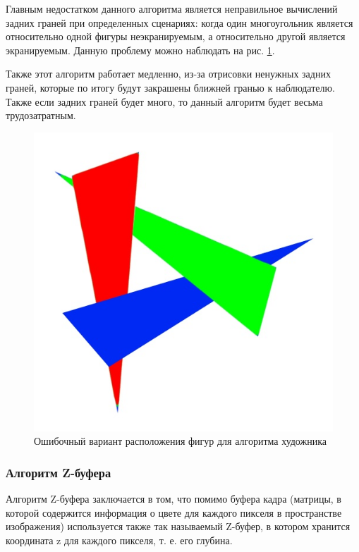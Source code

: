 \vspace{0.3cm}Главным недостатком данного алгоритма является неправильное вычислений задних граней при определенных сценариях: когда один многоугольник является относительно одной фигуры неэкранируемым, а относительно другой является экранируемым. Данную проблему можно наблюдать на рис. \ref{fig:painter}.

\vspace{0.3cm}Также этот алгоритм работает медленно, из-за отрисовки ненужных задних граней, которые по итогу будут закрашены ближней гранью к наблюдателю. Также если задних граней будет много, то данный алгоритм будет весьма трудозатратным.

\begin{figure}[ht!]
	\centering
	\includegraphics[scale=0.6]{painter}
	\caption{Ошибочный вариант расположения фигур для алгоритма художника}
	\label{fig:painter}
\end{figure}

\newpage

\subsubsection{Алгоритм Z-буфера}
\hspace{0.6cm}Алгоритм Z-буфера заключается в том, что помимо буфера кадра (матрицы, в которой содержится информация о цвете для каждого пикселя в пространстве изображения) используется также так называемый Z-буфер, в котором хранится координата z для каждого пикселя, т. е. его глубина.

